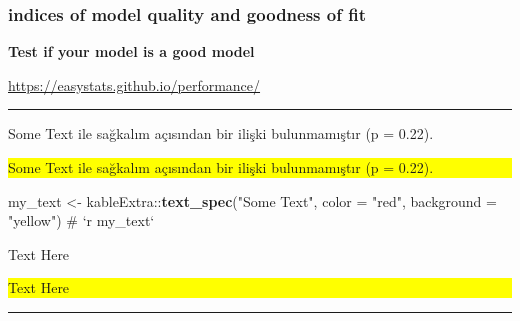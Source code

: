 \documentclass[
]{article}
\newenvironment{Shaded}{\begin{snugshade}}{\end{snugshade}}
\newcommand{\CommentTok}[1]{\textcolor[rgb]{0.54,0.53,0.53}{#1}}
\newcommand{\DataTypeTok}[1]{\textcolor[rgb]{0.00,0.34,0.68}{#1}}
\newcommand{\KeywordTok}[1]{\textcolor[rgb]{0.12,0.11,0.11}{\textbf{#1}}}
\newcommand{\NormalTok}[1]{\textcolor[rgb]{0.12,0.11,0.11}{#1}}
\newcommand{\OperatorTok}[1]{\textcolor[rgb]{0.12,0.11,0.11}{#1}}
\newcommand{\StringTok}[1]{\textcolor[rgb]{0.75,0.01,0.01}{#1}}
\begin{document}
\hypertarget{indices-of-model-quality-and-goodness-of-fit}{%
\subsubsection{indices of model quality and goodness of
fit}\label{indices-of-model-quality-and-goodness-of-fit}}

\textbf{Test if your model is a good model}

\url{https://easystats.github.io/performance/}

\begin{center}\rule{0.5\linewidth}{0.5pt}\end{center}

\pagebreak

Some Text ile sağkalım açısından bir ilişki bulunmamıştır (p = 0.22).

\noindent

\colorbox{yellow}{
\parbox{\dimexpr\linewidth-2\fboxsep}{

Some Text ile sağkalım açısından bir ilişki bulunmamıştır (p = 0.22).

}
}

\begin{Shaded}
\begin{Highlighting}[]
\NormalTok{my_text <-}\StringTok{ }\NormalTok{kableExtra}\OperatorTok{::}\KeywordTok{text_spec}\NormalTok{(}\StringTok{"Some Text"}\NormalTok{, }\DataTypeTok{color =} \StringTok{"red"}\NormalTok{, }\DataTypeTok{background =} \StringTok{"yellow"}\NormalTok{)}
\CommentTok{# `r my_text`}
\end{Highlighting}
\end{Shaded}

\pagebreak

\noindent

\colorbox{yellow}{
\parbox{\dimexpr\linewidth-2\fboxsep}{


}
}

\pagebreak

Text Here

\noindent

\colorbox{yellow}{
\parbox{\dimexpr\linewidth-2\fboxsep}{

Text Here

}
}

\pagebreak

\pagecolor{yellow}\afterpage{\nopagecolor}

\pagebreak

\begin{center}\rule{0.5\linewidth}{0.5pt}\end{center}
\end{document}

